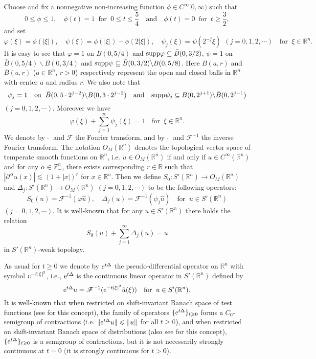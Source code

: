 \documentclass[11pt]{article}
\newcommand{\supp}{{\rm supp}}
\newcommand{\rme}{{\rm e}}
\begin{document}
  Choose and fix a nonnegative non-increasing function $\phi\in C^{\infty}[0,\infty)$ such that
$$
  0\leqslant\phi\leqslant1, \quad \phi(t)=1 \;\; \mbox{for}\;\; 0\leqslant t\leqslant\frac{5}{4} \quad \mbox{and} \quad
  \phi(t)=0 \;\; \mbox{for}\;\; t\geqslant\frac{3}{2},
$$
  and set
$$
  \varphi(\xi)=\phi(|\xi|), \quad \psi(\xi)=\phi(|\xi|)-\phi(2|\xi|), \quad \psi_j(\xi)=\psi(2^{-j}\xi)\;\,(j=0,1,2,\cdots)
  \quad \mbox{for}\;\; \xi\in\mathbb{R}^n.
$$
  It is easy to see that $\varphi=1$ on $\bar{B}(0,5/4)$ and $\supp\varphi\subseteq\bar{B}(0,3/2)$, $\psi=1$ on $\bar{B}(0,5/4)\backslash B(0,3/4)$
  and $\supp\psi\subseteq\bar{B}(0,3/2)\backslash B(0,5/8)$. Here $B(a,r)$ and $\bar{B}(a,r)$ ($a\in\mathbb{R}^n$, $r>0$) respectively represent the
  open and closed balls in $\mathbb{R}^n$ with center $a$ and radius $r$. We also note that
$$
  \psi_j=1 \quad \mbox{on}\;\; \bar{B}(0,5\cdot 2^{j-2})\backslash B(0,3\cdot 2^{j-2}) \quad \mbox{and} \quad
  \supp\psi_j\subseteq B(0, 2^{j+1})\backslash\bar{B}(0, 2^{j-1})
$$
  $(j=0,1,2,\cdots)$. Moreover we have
$$
  \varphi(\xi)+\sum_{j=1}^{\infty}\psi_j(\xi)=1 \quad \mbox{for}\;\; \xi\in\mathbb{R}^n.
$$
  We denote by $\;\hat{}\;$ and $\mathscr{F}$ the Fourier transform, and by $\;\check{}\;$ and $\mathscr{F}^{-1}$ the inverse Fourier transform. The
  notation $O_M(\mathbb{R}^n)$ denotes the topological vector space of temperate smooth functions on $\mathbb{R}^n$, i.e. $u\in O_M(\mathbb{R}^n)$
  if and only if $u\in C^{\infty}(\mathbb{R}^n)$ and for any $\alpha\in\mathbb{Z}_+^n$, there exists corresponding $r\in\mathbb{R}$ such that
  $|\partial^{\,\alpha}u(x)|\lesssim (1+|x|)^r$ for $x\in\mathbb{R}^n$. Then we define $S_0:S'(\mathbb{R}^n)\to O_M(\mathbb{R}^n)$ and $\Delta_j:
  S'(\mathbb{R}^n)\to O_M(\mathbb{R}^n)$ $(j=0,1,2,\cdots)$ to be the following operators:
$$
  S_0(u)=\mathscr{F}^{-1}(\varphi\hat{u}), \quad \Delta_j(u)=\mathscr{F}^{-1}(\psi_j\hat{u}) \quad \mbox{for}\;\; u\in S'(\mathbb{R}^n)
$$
  $(j=0,1,2,\cdots)$. It is well-known that for any $u\in S'(\mathbb{R}^n)$ there holds the relation
$$
  S_0(u)+\sum_{j=1}^{\infty}\Delta_j(u)=u
$$
  in $S'(\mathbb{R}^n)$-weak topology.

  As usual for $t\geqslant 0$ we denote by $\rme^{t\Delta}$ the pseudo-differential operator on $\mathbb{R}^n$ with symbol $\rme^{-t|\xi|^2}$, i.e.,
  $\rme^{t\Delta}$ is the continuous linear operator in $S'(\mathbb{R}^n)$ defined by
$$
  \rme^{t\Delta}u=\mathscr{F}^{-1}(\rme^{-t|\xi|^2}\hat{u}(\xi)) \quad \mbox{for}\;\; u\in S'(\mathbb{R}^n).
$$
  It is well-known that when restricted on shift-invariant Banach space of test functions (see \cite{LEM02} for this concept), the family of operators
  $\{\rme^{t\Delta}\}_{t\geqslant 0}$ forms a $C_0$-semigroup of contractions (i.e. $\|\rme^{t\Delta}u\|\leqslant\|u\|$ for all $t\geqslant 0$), and
  when restricted on shift-invariant Banach space of distributions (also see \cite{LEM02} for this concept), $\{\rme^{t\Delta}\}_{t\geqslant 0}$ is a
  semigroup of contractions, but it is not necessarily strongly continuous at $t=0$ (it is strongly continuous for $t>0$).
\end{document}
